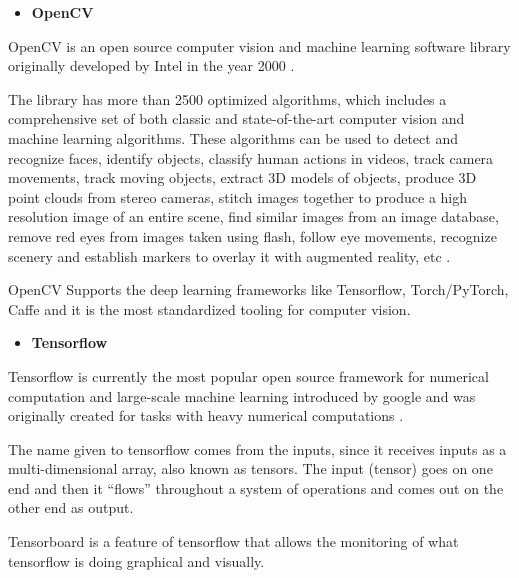     \begin{itemize}
        \item \textbf{OpenCV}
    \end{itemize}

    OpenCV is an open source computer vision and machine learning software library originally developed by Intel in the year 2000 \cite{Culjak2012}.\par

    The library has more than 2500 optimized algorithms, which includes a comprehensive set of both classic and state-of-the-art computer vision and machine learning algorithms. These algorithms can be used to detect and recognize faces, identify objects, classify human actions in videos, track camera movements, track moving objects, extract 3D models of objects, produce 3D point clouds from stereo cameras, stitch images together to produce a high resolution image of an entire scene, find similar images from an image database, remove red eyes from images taken using flash, follow eye movements, recognize scenery and establish markers to overlay it with augmented reality, etc \cite{opencvweb}. \par
    
    OpenCV Supports the deep learning frameworks like Tensorflow, Torch/PyTorch, Caffe and it is the most standardized tooling for computer vision.  

   \begin{itemize}
       \item \textbf{Tensorflow}
   \end{itemize} 

    \label{Tensorflow}
   

    Tensorflow is currently the most popular open source framework for numerical computation and large-scale machine learning introduced by google and was originally created for tasks with heavy numerical computations \cite{Abadi} \cite{Dignam1983}.
    
    

    The name given to tensorflow comes from the inputs, since it receives inputs as a multi-dimensional array, also known as tensors. The input (tensor) goes on one end and then it “flows” throughout a system of operations and comes out on the other end as output. \par 
    
    Tensorboard is a feature of tensorflow that allows the monitoring of what tensorflow is doing graphical and visually.\par

